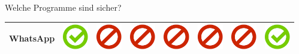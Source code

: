 \documentclass[final]{beamer}
\newlength{\sepwid}
\newlength{\twocolwid}
\begin{document}
\begin{frame}[t]
\begin{columns}[t, totalwidth=\textwidth]
\begin{column}{\twocolwid}
\begin{block}{Welche Programme sind sicher?}
\begin{tabular}{ l | C{4cm} | C{4cm} | C{4cm} | C{4.5cm} | C{4cm} | C{5cm} | C{3cm} | }
WhatsApp & \includegraphics[scale=0.5]{pics/haken.png} & \includegraphics[scale=0.5]{pics/nohaken.png} & \includegraphics[scale=0.5]{pics/nohaken.png} & \includegraphics[scale=0.5]{pics/nohaken.png} & \includegraphics[scale=0.5]{pics/nohaken.png} & \includegraphics[scale=0.5]{pics/nohaken.png} & \includegraphics[scale=0.5]{pics/haken.png} \tabularnewline
\hline
\end{tabular}

\end{block}

\end{column} %

\begin{column}{\sepwid}\end{column} %


\end{columns}
\end{frame}
\end{document}
